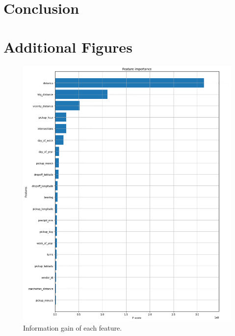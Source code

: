 \documentclass[a4paper]{article}
\begin{document}
\section{Conclusion}

\newpage
\footnotesize



\appendix
\newpage
\section{Additional Figures}
\begin{figure}[h!]
    \centering
    \includegraphics[width=\linewidth]{feature_importance_nonumber}
    \caption{Information gain of each feature.}
    \label{information_gain}
\end{figure}
\end{document}
